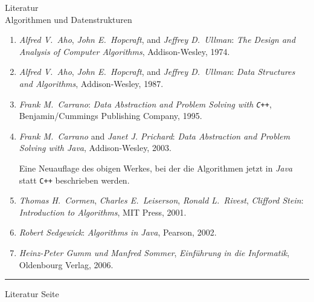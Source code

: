 \documentclass{slides}
\newcounter{mypage}
\begin{document}
\begin{slide}{}
 \begin{center}
Literatur \\
Algorithmen und Datenstrukturen
\end{center}

\footnotesize
\begin{enumerate}
\item \textsl{Alfred V.~Aho}, \textsl{John E.~Hopcraft}, and \textsl{Jeffrey D.~Ullman}:
      \emph{The Design and Analysis of Computer Algorithms}, Addison-Wesley, 1974. 

\item \textsl{Alfred V.~Aho}, \textsl{John E.~Hopcraft}, and \textsl{Jeffrey D.~Ullman}:
      \emph{Data Structures and Algorithms}, Addison-Wesley, 1987. 
\item \textsl{Frank M.~Carrano}:
      \emph{Data Abstraction and Problem Solving with \texttt{C++}}, 
      Benjamin/Cummings Publishing Company, 1995. 
\item \textsl{Frank M.~Carrano} and \textsl{Janet J. Prichard}:
      \emph{Data Abstraction and Problem Solving with \textsl{Java}}, 
      Addison-Wesley, 2003. 

      Eine Neuauflage des obigen Werkes, bei der die Algorithmen jetzt in
      \textsl{Java} statt \texttt{C++} beschrieben werden.
\item \textsl{Thomas H.~Cormen}, \textsl{Charles E.~Leiserson}, \textsl{Ronald L.~Rivest},
      \textsl{Clifford Stein}:
      \emph{Introduction to Algorithms}, 
      MIT Press, 2001. 
\item \textsl{Robert Sedgewick}: \emph{Algorithms in \textsl{Java}}, 
      Pearson, 2002.    
\item \textsl{Heinz-Peter Gumm und Manfred Sommer},
      \emph{Einf\"uhrung in die Informatik},
      Oldenbourg Verlag, 2006.
\end{enumerate}

\vspace*{\fill}
\tiny \addtocounter{mypage}{1}
\rule{17cm}{1mm}
Literatur  \hspace*{\fill} Seite 
\end{slide}
\end{document}
